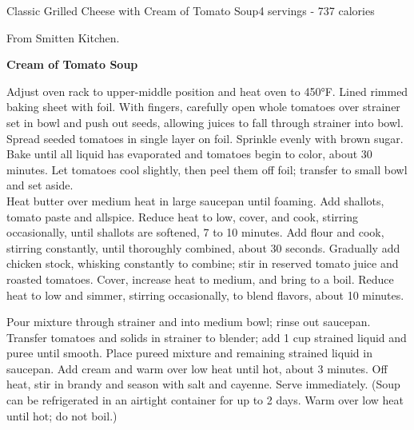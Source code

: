 \begin{recipe}{Classic Grilled Cheese with Cream of Tomato Soup}{4 servings - 737 calories}

\freeform From Smitten Kitchen.


\textbf{Cream of Tomato Soup}

Adjust oven rack to upper-middle position and heat oven to 450°F. Lined rimmed baking sheet with foil. With fingers, carefully open whole tomatoes over strainer set in bowl and push out seeds, allowing juices to fall through strainer into bowl. Spread seeded tomatoes in single layer on foil. Sprinkle evenly with brown sugar. Bake until all liquid has evaporated and tomatoes begin to color, about 30 minutes. Let tomatoes cool slightly, then peel them off foil; transfer to small bowl and set aside.\\

Heat butter over medium heat in large saucepan until foaming. Add shallots, tomato paste and allspice. Reduce heat to low, cover, and cook, stirring occasionally, until shallots are softened, 7 to 10 minutes. Add flour and cook, stirring constantly, until thoroughly combined, about 30 seconds. Gradually add chicken stock, whisking constantly to combine; stir in reserved tomato juice and roasted tomatoes. Cover, increase heat to medium, and bring to a boil. Reduce heat to low and simmer, stirring occasionally, to blend flavors, about 10 minutes.\newpage

Pour mixture through strainer and into medium bowl; rinse out saucepan. Transfer tomatoes and solids in strainer to blender; add 1 cup strained liquid and puree until smooth. Place pureed mixture and remaining strained liquid in saucepan. Add cream and warm over low heat until hot, about 3 minutes. Off heat, stir in brandy and season with salt and cayenne. Serve immediately. (Soup can be refrigerated in an airtight container for up to 2 days. Warm over low heat until hot; do not boil.)\\


\end{recipe}
